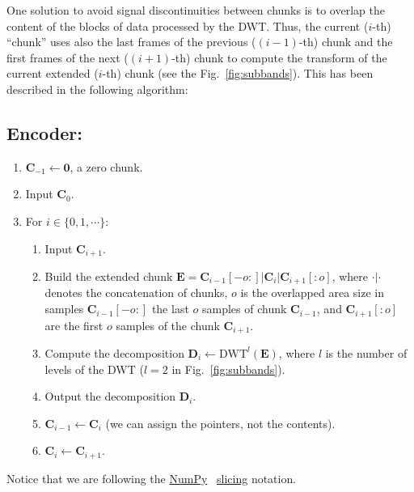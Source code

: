 One solution to avoid signal discontinuities between chunks is to
overlap the content of the blocks of data processed by the DWT. Thus,
the current ($i$-th) ``chunk'' uses also the last frames of the
previous ($(i-1)$-th) chunk and the first frames of the next
($(i+1)$-th) chunk to compute the transform of the current extended
($i$-th) chunk (see the Fig.~\ref{fig:subbands}). This has been
described in the following algorithm:

\subsection*{Encoder:}
\begin{enumerate}
\item ${\mathbf C}_{-1}\leftarrow{\mathbf 0}$, a zero chunk.
\item Input ${\mathbf C}_0$.
\item For $i\in\{0,1,\cdots\}$:   
  \begin{enumerate}               
  \item Input ${\mathbf C}_{i+1}$.
  \item Build the extended chunk ${\mathbf E}={\mathbf
    C}_{i-1}[-o:]|{\mathbf C}_i|{\mathbf C}_{i+1}[:o]$, where
    $\cdot|\cdot$ denotes the concatenation of chunks, $o$ is the
    overlapped area size in samples ${\mathbf C}_{i-1}[-o:]$ the last
    $o$ samples of chunk ${\mathbf C}_{i-1}$, and ${\mathbf
      C}_{i+1}[:o]$ are the first $o$ samples of the chunk ${\mathbf
      C}_{i+1}$.
  \item Compute the decomposition ${\mathbf D}_i \leftarrow
    \text{DWT}^l({\mathbf E})$, where $l$ is the number of levels of
    the DWT ($l=2$ in Fig.~\ref{fig:subbands}).
  \item Output the decomposition ${\mathbf D}_i$.
  \item ${\mathbf C}_{i-1}\leftarrow {\mathbf C}_i$ (we can assign the pointers, not the contents).
  \item ${\mathbf C}_i\leftarrow {\mathbf C}_{i+1}$.
  \end{enumerate}
\end{enumerate}

Notice that we are following the
\href{https://numpy.org/doc/stable/reference/}{NumPy}~\cite{numpy,harris2020array}
\href{https://www.pythoninformer.com/python-libraries/numpy/index-and-slice/}{slicing}
notation.


